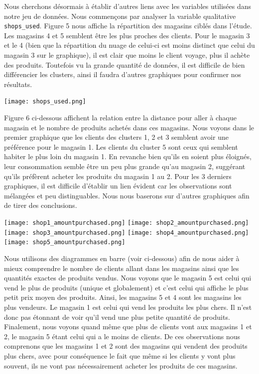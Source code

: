 \documentclass[12pt,a4paper]{book}
\newcommand{\1}{\mathds{1}}
\begin{document}
\vspace{5 mm}
\noindent
Nous cherchons désormais à établir d'autres liens avec les variables utilisées dans notre jeu de données. Nous commençons par analyser la variable qualitative \verb|shops_used|. Figure 5 nous affiche la répartition des magasins ciblés dans l'étude. Les magasins 4 et 5 semblent être les plus proches des clients. Pour le magasin 3 et le 4 (bien que la répartition du nuage de celui-ci est moins distinct que celui du magasin 3 sur le graphique), il est clair que moins le client voyage, plus il achète des produits. Toutefois vu la grande quantité de données, il est difficile de bien différencier les clusters, ainsi il faudra d'autres graphiques pour confirmer nos résultats.

\begin{center}
\texttt{[image: shops\_used.png]}
\end{center}


\vspace{5 mm}
\noindent
Figure 6 ci-dessous affichent la relation entre la distance pour aller à chaque magasin et le nombre de produits achetés dans ces magasins. Nous voyons dans le  premier graphique que les clients des clusters 1, 2 et 3 semblent avoir une préférence pour le magasin 1. Les clients du cluster 5 sont ceux qui semblent habiter le plus loin du magasin 1. En revanche bien qu'ils en soient plus éloignés, leur consommation semble être un peu plus grande qu'au magasin 2, suggérant qu'ils préfèrent acheter les produits du magasin 1 au 2. Pour les 3 derniers graphiques, il est difficile d'établir un lien évident car les observations sont mélangées et peu distinguables. Nous nous baserons sur d'autres graphiques afin de tirer des conclusions.


\begin{center}
\texttt{[image: shop1\_amountpurchased.png]}
\texttt{[image: shop2\_amountpurchased.png]}
\texttt{[image: shop3\_amountpurchased.png]}
\texttt{[image: shop4\_amountpurchased.png]}
\texttt{[image: shop5\_amountpurchased.png]}
\end{center}


\noindent
Nous utilisons des diagrammes en barre (voir ci-dessous) afin de nous aider à mieux comprendre le nombre de clients allant dans les magasins ainsi que les quantités exactes de produits vendus. Nous voyons que le magasin 5 est celui qui vend le plus de produits (unique et globalement) et c'est celui qui affiche le plus petit prix moyen des produits. Ainsi, les magasins 5 et 4 sont les magasins les plus vendeurs. Le magasin 1 est celui qui vend les produits les plus chers. Il n'est donc pas étonnant de voir qu'il vend une plus petite quantité de produits. Finalement, nous voyons quand même que plus de clients vont aux magasins 1 et 2, le magasin 5 étant celui qui a le moins de clients. De ces observations nous comprenons que les magasins 1 et 2 sont des magasins qui vendent des produits plus chers, avec pour conséquence le fait que même si les clients y vont plus souvent, ils ne vont pas nécessairement acheter les produits de ces magasins. 
\end{document}
